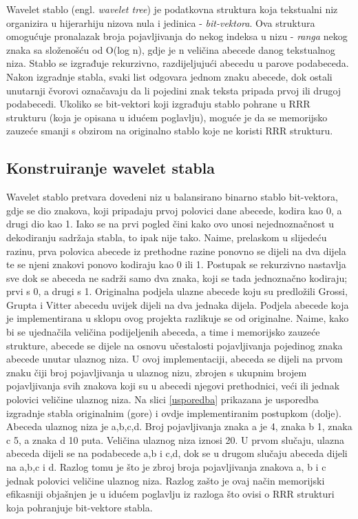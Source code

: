 Wavelet stablo (engl. \textit{wavelet tree}) je podatkovna struktura koja tekstualni niz organizira u hijerarhiju nizova nula i jedinica - \textit{bit-vektora}. Ova struktura omogućuje pronalazak broja pojavljivanja do nekog indeksa u nizu - \textit{ranga} nekog znaka sa složenošću od O(log n), gdje je n veličina abecede danog tekstualnog niza. 
Stablo se izgrađuje rekurzivno, razdijeljujući abecedu u parove podabeceda. Nakon izgradnje stabla, svaki list odgovara jednom znaku abecede, dok ostali unutarnji čvorovi označavaju da li pojedini znak teksta pripada prvoj ili drugoj podabecedi.
Ukoliko se bit-vektori koji izgrađuju stablo pohrane u RRR strukturu (koja je opisana u idućem poglavlju), moguće je da se memorijsko zauzeće smanji s obzirom na originalno stablo koje ne koristi RRR strukturu.


\subsection{Konstruiranje wavelet stabla}

Wavelet stablo pretvara dovedeni niz u balansirano binarno stablo bit-vektora, gdje se dio znakova, koji pripadaju prvoj polovici dane abecede, kodira kao 0, a drugi dio kao 1. Iako se na prvi pogled čini kako ovo unosi nejednoznačnost u dekodiranju sadržaja stabla, to ipak nije tako. Naime, prelaskom u slijedeću razinu, prva polovica abecede iz prethodne razine ponovno se dijeli na dva dijela te se njeni znakovi ponovo kodiraju kao 0 ili 1. Postupak se rekurzivno nastavlja sve dok se abeceda ne sadrži samo dva znaka, koji se tada jednoznačno kodiraju; prvi s 0, a drugi s 1. 
Originalna podjela ulazne abecede koju su predložili Grossi, Grupta i Vitter \cite{wavelet}  abecedu uvijek dijeli na dva jednaka dijela. Podjela abecede koja je implementirana u sklopu ovog projekta razlikuje se od originalne. Naime, kako bi se ujednačila veličina podijeljenih abeceda, a time i memorijsko zauzeće strukture, abecede se dijele na osnovu učestalosti pojavljivanja pojedinog znaka abecede unutar ulaznog niza. U ovoj implementaciji, abeceda se dijeli na prvom znaku čiji broj pojavljivanja u ulaznog nizu, zbrojen s ukupnim brojem pojavljivanja svih znakova koji su u abecedi njegovi prethodnici, veći ili jednak polovici veličine ulaznog niza.
Na slici \ref{usporedba} prikazana je usporedba izgradnje stabla originalnim (gore) i ovdje implementiranim postupkom (dolje). Abeceda ulaznog niza je {a,b,c,d}. Broj pojavljivanja znaka a je 4, znaka b 1, znaka c 5, a znaka d 10 puta. Veličina ulaznog niza iznosi 20. U prvom slučaju, ulazna abeceda dijeli se na podabecede {a,b} i {c,d}, dok se u drugom slučaju abeceda dijeli na {a,b,c} i {d}. Razlog tomu je što je zbroj broja pojavljivanja znakova a, b i c jednak polovici veličine ulaznog niza.
Razlog zašto je ovaj način memorijski efikasniji objašnjen je u idućem poglavlju iz razloga što ovisi o RRR strukturi koja pohranjuje bit-vektore stabla.

